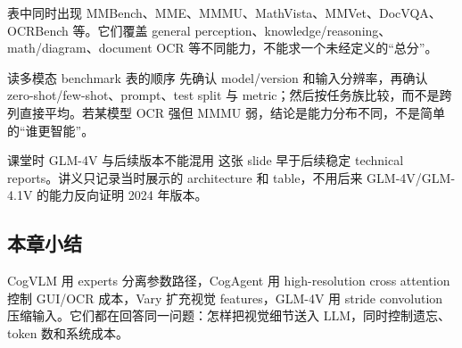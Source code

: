 表中同时出现 MMBench、MME、MMMU、MathVista、MMVet、DocVQA、OCRBench 等。它们覆盖 general perception、knowledge/reasoning、math/diagram、document OCR 等不同能力，不能求一个未经定义的“总分”。


\begin{knowledgebox}{读多模态 benchmark 表的顺序}
先确认 model/version 和输入分辨率，再确认 zero-shot/few-shot、prompt、test split 与 metric；然后按任务族比较，而不是跨列直接平均。若某模型 OCR 强但 MMMU 弱，结论是能力分布不同，不是简单的“谁更智能”。
\end{knowledgebox}

\begin{warningbox}{课堂时 GLM-4V 与后续版本不能混用}
这张 slide 早于后续稳定 technical reports。讲义只记录当时展示的 architecture 和 table，不用后来 GLM-4V/GLM-4.1V 的能力反向证明 2024 年版本。
\end{warningbox}

\subsection{本章小结}

CogVLM 用 experts 分离参数路径，CogAgent 用 high-resolution cross attention 控制 GUI/OCR 成本，Vary 扩充视觉 features，GLM-4V 用 stride convolution 压缩输入。它们都在回答同一问题：怎样把视觉细节送入 LLM，同时控制遗忘、token 数和系统成本。

